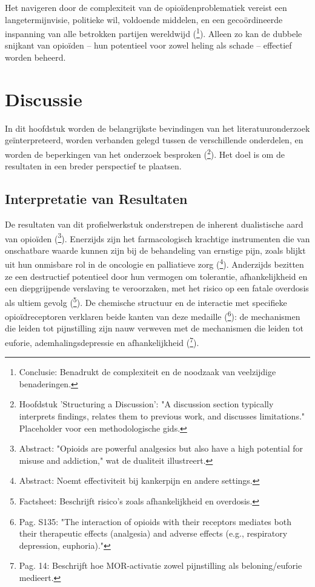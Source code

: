 \documentclass[11pt, a4paper]{report} %
\begin{document}
Het navigeren door de complexiteit van de opioïdenproblematiek vereist een langetermijnvisie, politieke wil, voldoende middelen, en een gecoördineerde inspanning van alle betrokken partijen wereldwijd (\cite{Maclean2020EconomicStudiesOpioid}\footnote{Conclusie: Benadrukt de complexiteit en de noodzaak van veelzijdige benaderingen.}). Alleen zo kan de dubbele snijkant van opioïden – hun potentieel voor zowel heling als schade – effectief worden beheerd.
\chapter{Discussie}
\label{ch:discussie}

In dit hoofdstuk worden de belangrijkste bevindingen van het literatuuronderzoek geïnterpreteerd, worden verbanden gelegd tussen de verschillende onderdelen, en worden de beperkingen van het onderzoek besproken (\cite{SomeGuidelineForWritingDiscussionSections}\footnote{Hoofdstuk 'Structuring a Discussion': "A discussion section typically interprets findings, relates them to previous work, and discusses limitations." Placeholder voor een methodologische gids.}). Het doel is om de resultaten in een breder perspectief te plaatsen.

\section{Interpretatie van Resultaten}
De resultaten van dit profielwerkstuk onderstrepen de inherent dualistische aard van opioïden (\cite{Volkow2021ChangingOpioidCrisis}\footnote{Abstract: "Opioids are powerful analgesics but also have a high potential for misuse and addiction," wat de dualiteit illustreert.}). Enerzijds zijn het farmacologisch krachtige instrumenten die van onschatbare waarde kunnen zijn bij de behandeling van ernstige pijn, zoals blijkt uit hun onmisbare rol in de oncologie en palliatieve zorg (\cite{Riley2008OxycodoneReview}\footnote{Abstract: Noemt effectiviteit bij kankerpijn en andere settings.}). Anderzijds bezitten ze een destructief potentieel door hun vermogen om tolerantie, afhankelijkheid en een diepgrijpende verslaving te veroorzaken, met het risico op een fatale overdosis als ultiem gevolg (\cite{WHO2023Opioid}\footnote{Factsheet: Beschrijft risico's zoals afhankelijkheid en overdosis.}). De chemische structuur en de interactie met specifieke opioïdreceptoren verklaren beide kanten van deze medaille (\cite{Trescot2008OpioidPharm}\footnote{Pag. S135: "The interaction of opioids with their receptors mediates both their therapeutic effects (analgesia) and adverse effects (e.g., respiratory depression, euphoria)."}): de mechanismen die leiden tot pijnstilling zijn nauw verweven met de mechanismen die leiden tot euforie, ademhalingsdepressie en afhankelijkheid (\cite{Kosten2002NeurobiologyDependence}\footnote{Pag. 14: Beschrijft hoe MOR-activatie zowel pijnstilling als beloning/euforie medieert.}).
\end{document}
